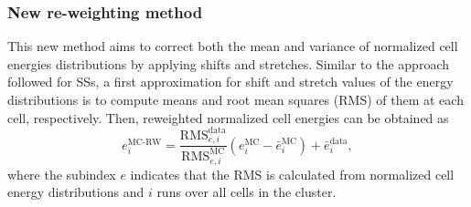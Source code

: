 




\subsubsection{New re-weighting method}

This new method aims to correct both the mean and variance of normalized cell energies distributions by applying shifts and stretches. Similar to the approach followed for \acp{SS}, a first approximation for shift and stretch values of the energy distributions is to compute means and root mean squares (RMS) of them at each cell, respectively. Then, reweighted normalized cell energies can be obtained as
\begin{equation}
    \label{eq:ss_corrections:cell_rw:calculation:new:normalized_e}
    e_i^{\text{MC-RW}} = \frac{\text{RMS}_{e,i}^{\text{data}}}{\text{RMS}_{e,i}^{\text{MC}}} \left( e_i^{\text{MC}} - \bar e_i^{\text{MC}} \right) + \bar e_i^{\text{data}},
\end{equation}
where the subindex \(e\) indicates that the RMS is calculated from normalized cell energy distributions and \(i\) runs over all cells in the cluster.

